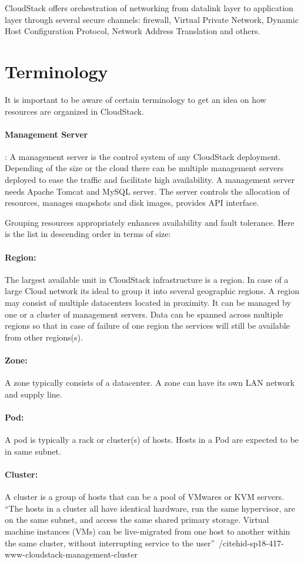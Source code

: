 CloudStack offers orchestration of networking from datalink layer
to application layer through several secure channels:
firewall, Virtual Private Network, Dynamic Host Configuration 
Protocol, Network Address Translation and others.

\section{Terminology}

It is important to be aware of certain terminology to get an idea on
how resources are organized in CloudStack.
\paragraph{Management Server}:
A management server is the control system of any CloudStack deployment. 
Depending of the size or the cloud there can be multiple management 
servers deployed to ease the traffic and facilitate high availability.
A management server needs Apache Tomcat and MySQL server. The server
controls the allocation of resources, manages snapshots and disk images,
provides API interface.



Grouping resources appropriately enhances availability and fault tolerance. Here is the 
list in descending order in terms of size:
\paragraph{Region:}	The largest available unit in CloudStack infrastructure is a 
region. In case of a large Cloud network its ideal to group it into 
several geographic regions. A region may consist of multiple datacenters
located in proximity. It can be managed by one or a cluster of management
servers. Data can be spanned across multiple regions so that in case of
failure of one region the services will still be available from other regions(s).
\paragraph{Zone:}	A zone typically consists of a datacenter. A zone can have its own LAN
network and supply line. 
\paragraph{Pod:}	A pod is typically a rack or cluster(s) of hosts. Hosts in a Pod are 
expected to be in same subnet. 
\paragraph{Cluster:} 	A cluster is a group of hosts that can be a pool of VMwares or KVM 
servers. ``The hosts in a cluster all have identical hardware, run the same 
hypervisor, are on the same subnet, and access the same shared primary storage.
Virtual machine instances (VMs) can be live-migrated from one host to another
within the same cluster, without interrupting service to the user''~/cite{hid-sp18-417-www-cloudstack-management-cluster}
